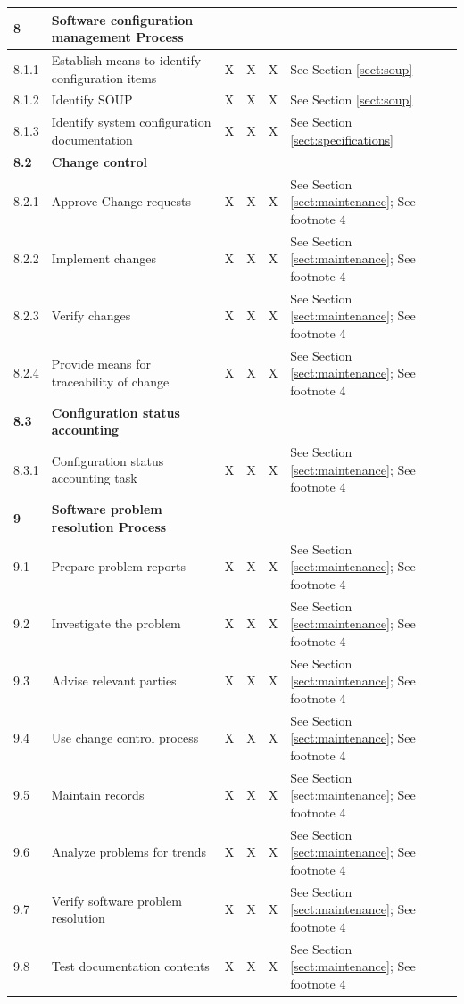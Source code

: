 \documentclass[]{article}
\begin{document}
\begin{center}
\begin{longtable}{ |p{1.3cm}| p{5.5cm}| p{0.7cm}| p{0.7cm}| p{0.7cm}| p{3.5cm}| }
	\rowcolor{blue!25} \textbf{8} & \textbf{Software configuration management Process} &  &  &  &  \\ \hline
	8.1.1 & Establish means to identify configuration items & X & X & X & See Section \ref{sect:soup} \\ \hline
	8.1.2 & Identify SOUP & X & X & X & See Section \ref{sect:soup} \\ \hline
	8.1.3 & Identify system configuration documentation & X & X & X & See Section \ref{sect:specifications} \\ \hline
	
	
	\rowcolor{blue!25} \textbf{8.2} & \textbf{Change control} &  &  &  &  \\ \hline
	8.2.1 & Approve Change requests & X & X & X & See Section \ref{sect:maintenance}; See footnote 4 \\ \hline
	8.2.2 & Implement changes  & X & X & X & See Section \ref{sect:maintenance}; See footnote 4 \\ \hline
	8.2.3 & Verify changes & X & X & X & See Section \ref{sect:maintenance}; See footnote 4 \\ \hline
	8.2.4 & Provide means for traceability of change & X & X & X & See Section \ref{sect:maintenance}; See footnote 4 \\ \hline
	
	\rowcolor{blue!25} \textbf{8.3} & \textbf{Configuration status accounting}  &  &  &  &  \\ \hline
	8.3.1 & Configuration status accounting task & X & X & X & See Section \ref{sect:maintenance}; See footnote 4 \\ \hline
	
	\rowcolor{blue!25} \textbf{9} & \textbf{Software problem resolution Process} &  &  &  &  \\ \hline
	9.1 & Prepare problem reports  & X & X & X & See Section \ref{sect:maintenance}; See footnote 4 \\ \hline
	9.2 & Investigate the problem  & X & X & X & See Section \ref{sect:maintenance}; See footnote 4 \\ \hline
	9.3 & Advise relevant parties  & X & X & X & See Section \ref{sect:maintenance}; See footnote 4 \\ \hline
	9.4 & Use change control process  & X & X & X & See Section \ref{sect:maintenance}; See footnote 4 \\ \hline
	9.5 & Maintain records  & X & X & X & See Section \ref{sect:maintenance}; See footnote 4 \\ \hline
	9.6 & Analyze problems for trends  & X & X & X & See Section \ref{sect:maintenance}; See footnote 4 \\ \hline
	9.7 & Verify software problem resolution  & X & X & X & See Section \ref{sect:maintenance}; See footnote 4 \\ \hline
	9.8 & Test documentation contents  & X & X & X & See Section \ref{sect:maintenance}; See footnote 4 \\ \hline
	

\end{longtable}
\end{center}
\end{document}
